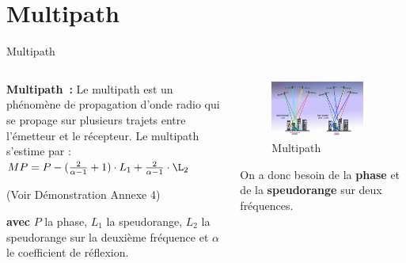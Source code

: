 \documentclass[xcolor=dvipsnames,envcountsect]{beamer}
\begin{document}
\section{Multipath}
\begin{frame}{Multipath}
	\begin{columns}
		\begin{column}{0.5\textwidth}
			\textbf{Multipath :} 
			Le multipath est un phénomène de propagation d'onde radio qui se propage sur plusieurs trajets entre l'émetteur et le récepteur.
			\newline
			Le multipath s'estime par : $MP = P - (\frac{2}{\alpha - 1} + 1) \cdot L_1 + \frac{2}{\alpha - 1} \cdot \L_2$
			\begin{flushright}
				\tiny{(Voir Démonstration Annexe 4)}
			\end{flushright}
			{\small \textbf{avec} $P$ la phase, $L_1$ la speudorange, $L_2$ la speudorange sur la deuxième fréquence et $\alpha$ le coefficient de réflexion.}
		\end{column}
		\begin{column}{0.5\textwidth}
			\begin{figure}
				\centering
				\includegraphics[width=0.9\textwidth]{./Figures/multipath2.png}
				\caption {Multipath \cite{esa}}	
			\end{figure}
			On a donc besoin de la \textbf{phase} et de la \textbf{speudorange} sur deux fréquences.
		\end{column}	
	\end{columns}
\end{frame}
\end{document}
